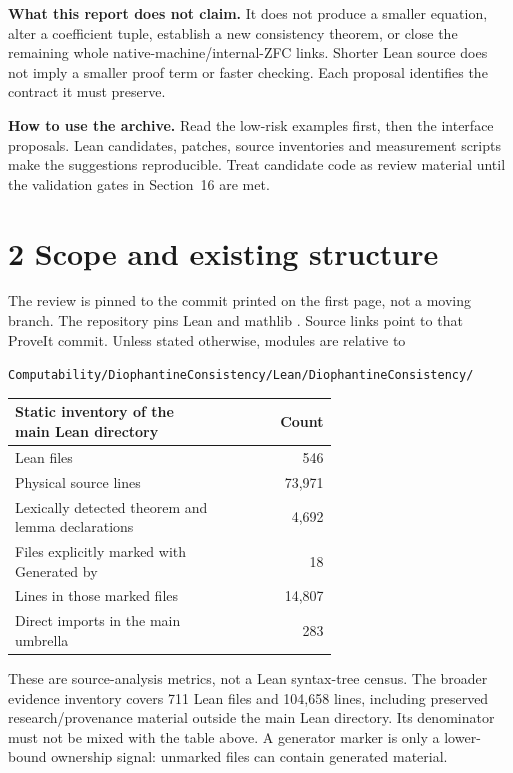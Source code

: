 \documentclass[11pt,letterpaper]{article}
\newcommand{\code}[1]{{\small\texttt{\detokenize{#1}}}}
\newcommand{\pageheading}[1]{\newpage\section*{#1}}
\begin{document}
\textbf{What this report does not claim.} It does not produce a smaller equation, alter a coefficient tuple, establish a new consistency theorem, or close the remaining whole native-machine/internal-ZFC links. Shorter Lean source does not imply a smaller proof term or faster checking. Each proposal identifies the contract it must preserve.

\textbf{How to use the archive.} Read the low-risk examples first, then the interface proposals. Lean candidates, patches, source inventories and measurement scripts make the suggestions reproducible. Treat candidate code as review material until the validation gates in Section~16 are met.

\pageheading{2 Scope and existing structure}
The review is pinned to the commit printed on the first page, not a moving \code{main} branch. The repository pins Lean \code{v4.32.0} and mathlib \code{v4.32.0}. Source links point to that ProveIt commit. Unless stated otherwise, modules are relative to
\begin{center}\small\texttt{Computability/DiophantineConsistency/Lean/DiophantineConsistency/}\end{center}

\begin{tabular}{@{}L{0.64\linewidth}r@{}}\toprule
Static inventory of the main Lean directory & Count\\\midrule
Lean files & 546\\
Physical source lines & 73,971\\
Lexically detected theorem and lemma declarations & 4,692\\
Files explicitly marked with Generated by & 18\\
Lines in those marked files & 14,807\\
Direct imports in the main umbrella & 283\\\bottomrule
\end{tabular}

These are source-analysis metrics, not a Lean syntax-tree census. The broader evidence inventory covers 711 Lean files and 104,658 lines, including preserved research/provenance material outside the main Lean directory. Its denominator must not be mixed with the table above. A generator marker is only a lower-bound ownership signal: unmarked files can contain generated material.
\end{document}

